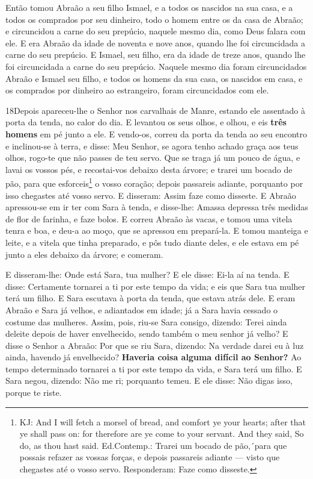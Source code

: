 Então tomou Abraão a seu filho Ismael, e a todos os nascidos na
sua casa, e a todos os comprados por seu dinheiro, todo o homem
entre os da casa de Abraão; e circuncidou a carne do seu prepúcio,
naquele mesmo dia, como Deus falara com ele. E era Abraão da
idade de noventa e nove anos, quando lhe foi circuncidada a carne do
seu prepúcio. E Ismael, seu filho, era da idade de treze
anos, quando lhe foi circuncidada a carne do seu prepúcio.
Naquele mesmo dia foram circuncidados Abraão e Ismael seu
filho, e todos os homens da sua casa, os nascidos em casa, e
os comprados por dinheiro ao estrangeiro, foram circuncidados com
ele.

\smallskip

\lettrine{18} Depois apareceu-lhe o Senhor nos carvalhais de
Manre, estando ele assentado à porta da tenda, no calor do dia.
E levantou os seus olhos, e olhou, e eis \textbf{três homens} em
pé junto a ele. E vendo-os, correu da porta da tenda ao seu encontro
e inclinou-se à terra, e disse: Meu Senhor, se agora tenho
achado graça aos teus olhos, rogo-te que não passes de teu servo.
Que se traga já um pouco de água, e lavai os vossos pés, e
recostai-vos debaixo desta árvore; e trarei um bocado de pão,
para que esforceis\footnote{KJ: And I will fetch a morsel of bread,
and comfort ye your hearts; after that ye shall pass on: for
therefore are ye come to your servant. And they said, So do, as thou
hast said. Ed.Contemp.: Trarei um bocado de pão,´para que possais
refazer as vossas forças, e depois passareis adiante --- visto que
chegastes até o vosso servo. Responderam: Faze como disseste.} o
vosso coração; depois passareis adiante, porquanto por isso
chegastes até vosso servo. E disseram: Assim faze como disseste.
E Abraão apressou-se em ir ter com Sara à tenda, e disse-lhe:
Amassa depressa três medidas de flor de farinha, e faze bolos. E
correu Abraão às vacas, e tomou uma vitela tenra e boa, e deu-a ao
moço, que se apressou em prepará-la. E tomou manteiga e leite, e
a vitela que tinha preparado, e pôs tudo diante deles, e ele estava
em pé junto a eles debaixo da árvore; e comeram.

E disseram-lhe: Onde está Sara, tua mulher? E ele disse: Ei-la aí
na tenda. E disse: Certamente tornarei a ti por este tempo da
vida; e eis que Sara tua mulher terá um filho. E Sara escutava à
porta da tenda, que estava atrás dele. E eram Abraão e Sara
já velhos, e adiantados em idade; já a Sara havia cessado o costume
das mulheres. Assim, pois, riu-se Sara consigo, dizendo:
Terei ainda deleite depois de haver envelhecido, sendo também o meu
senhor já velho? E disse o Senhor a Abraão: Por que se riu
Sara, dizendo: Na verdade darei eu à luz ainda, havendo já
envelhecido? \textbf{Haveria coisa alguma difícil ao Senhor?}
Ao tempo determinado tornarei a ti por este tempo da vida, e Sara
terá um filho. E Sara negou, dizendo: Não me ri; porquanto
temeu. E ele disse: Não digas isso, porque te riste.

